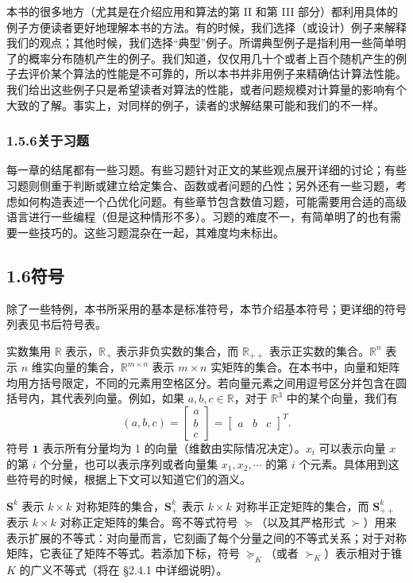 \documentclass[UTF8,12pt,a4paper,fontset=fandol]{ctexart}
\begin{document}
本书的很多地方（尤其是在介绍应用和算法的第 II 和第 III 部分）都利用具体的例子方便读者更好地理解本书的方法。有的时候，我们选择（或设计）例子来解释我们的观点；其他时候，我们选择“典型”例子。所谓典型例子是指利用一些简单明了的概率分布随机产生的例子。我们知道，仅仅用几十个或者上百个随机产生的例子去评价某个算法的性能是不可靠的，所以本书并非用例子来精确估计算法性能。我们给出这些例子只是希望读者对算法的性能，或者问题规模对计算量的影响有个大致的了解。事实上，对同样的例子，读者的求解结果可能和我们的不一样。

\subsubsection*{1.5.6\quad 关于习题}

每一章的结尾都有一些习题。有些习题针对正文的某些观点展开详细的讨论；有些习题则侧重于判断或建立给定集合、函数或者问题的凸性；另外还有一些习题，考虑如何构造表述一个凸优化问题。有些章节包含数值习题，可能需要用合适的高级语言进行一些编程（但是这种情形不多）。习题的难度不一，有简单明了的也有需要一些技巧的。这些习题混杂在一起，其难度均未标出。

\subsection*{1.6\quad 符号}

除了一些特例，本书所采用的基本是标准符号，本节介绍基本符号；更详细的符号列表见书后符号表。

实数集用 $\mathbb{R}$ 表示，$\mathbb{R}_+$ 表示非负实数的集合，而 $\mathbb{R}_{++}$ 表示正实数的集合。$\mathbb{R}^n$ 表示 $n$ 维实向量的集合，$\mathbb{R}^{m\times n}$ 表示 $m\times n$ 实矩阵的集合。在本书中，向量和矩阵均用方括号限定，不同的元素用空格区分。若向量元素之间用逗号区分并包含在圆括号内，其代表列向量。例如，如果 $a,b,c\in\mathbb{R}$，对于 $\mathbb{R}^3$ 中的某个向量，我们有
\[
  (a,b,c)=
  \begin{bmatrix}
  a\\
  b\\
  c
  \end{bmatrix}
  =
  \begin{bmatrix}
  a & b & c
  \end{bmatrix}^T.
\]
符号 $\mathbf{1}$ 表示所有分量均为 1 的向量（维数由实际情况决定）。$x_i$ 可以表示向量 $x$ 的第 $i$ 个分量，也可以表示序列或者向量集 $x_1,x_2,\cdots$ 的第 $i$ 个元素。具体用到这些符号的时候，根据上下文可以知道它们的涵义。

$\mathbf{S}^k$ 表示 $k\times k$ 对称矩阵的集合，$\mathbf{S}_+^k$ 表示 $k\times k$ 对称半正定矩阵的集合，而 $\mathbf{S}_{++}^k$ 表示 $k\times k$ 对称正定矩阵的集合。弯不等式符号 $\succeq$（以及其严格形式 $\succ$）用来表示扩展的不等式：对向量而言，它刻画了每个分量之间的不等式关系；对于对称矩阵，它表征了矩阵不等式。若添加下标，符号 $\succeq_K$（或者 $\succ_K$）表示相对于锥 $K$ 的广义不等式（将在 §2.4.1 中详细说明）。
\end{document}
